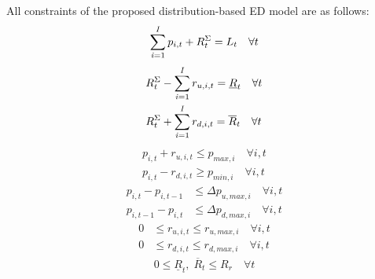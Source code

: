 All constraints of the proposed distribution-based ED model are as follows:
\begin{equation} \label{DB_5}
\sum_{{\it i}=1}^{{\it I}}p_{i,t}+R_{t}^{\Sigma}=L_{t} \quad \forall t
\end{equation}
\begin{equation} \label{DB_6}
\begin{aligned}
& R_{t}^{\Sigma}-\sum_{{\it i}=1}^{{\it I}}r_{u,i,t}=\underline{R}_{t} \quad \forall t \\
& R_{t}^{\Sigma}+\sum_{{\it i}=1}^{{\it I}}r_{d,i,t}=\overline{R}_{t} \quad \forall t
\end{aligned}
\end{equation}
\begin{equation} \label{DB_7}
\begin{aligned}
p_{i,t} + r_{u,i,t} \leq p_{max,i} \quad \forall i,t \\
p_{i,t} - r_{d,i,t} \geq p_{min,i} \quad \forall i,t
\end{aligned}
\end{equation}
\begin{equation} \label{DB_8}
\begin{aligned}
p_{i,t}-p_{i,t-1} & \leq \Delta p_{u,max,i} \quad \forall i,t \\
p_{i,t-1}-p_{i,t} & \leq \Delta p_{d,max,i} \quad \forall i,t
\end{aligned}
\end{equation}
\begin{equation} \label{DB_9}
\begin{aligned}
0 & \leq r_{u,i,t} \leq r_{u,max,i} \quad \forall i,t \\
0 & \leq r_{d,i,t} \leq r_{d,max,i} \quad \forall i,t
\end{aligned}
\end{equation}
\begin{equation} \label{DB_10}
\begin{aligned}
0 \leq \underline{R}_{t},\;  \overline{R}_{t}\leq R_{r} \quad \forall t
\end{aligned}
\end{equation}


